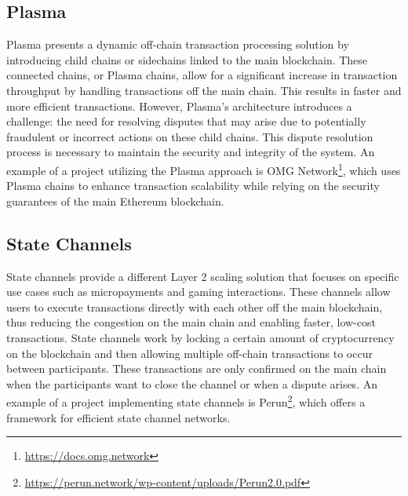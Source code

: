 \subsection{Plasma}
Plasma presents a dynamic off-chain transaction processing solution by introducing child chains or sidechains linked to the main blockchain. These connected chains, or Plasma chains, allow for a significant increase in transaction throughput by handling transactions off the main chain. This results in faster and more efficient transactions. However, Plasma's architecture introduces a challenge: the need for resolving disputes that may arise due to potentially fraudulent or incorrect actions on these child chains\cite{thibault_blockchain_2022}. This dispute resolution process is necessary to maintain the security and integrity of the system. An example of a project utilizing the Plasma approach is OMG Network\footnote{\url{https://docs.omg.network}}, which uses Plasma chains to enhance transaction scalability while relying on the security guarantees of the main Ethereum blockchain.

\subsection{State Channels}
State channels provide a different Layer 2 scaling solution that focuses on specific use cases such as micropayments and gaming interactions. These channels allow users to execute transactions directly with each other off the main blockchain, thus reducing the congestion on the main chain and enabling faster, low-cost transactions\cite{negka_blockchain_2021}. State channels work by locking a certain amount of cryptocurrency on the blockchain and then allowing multiple off-chain transactions to occur between participants. These transactions are only confirmed on the main chain when the participants want to close the channel or when a dispute arises. An example of a project implementing state channels is Perun\footnote{\url{https://perun.network/wp-content/uploads/Perun2.0.pdf}}, which offers a framework for efficient state channel networks.

